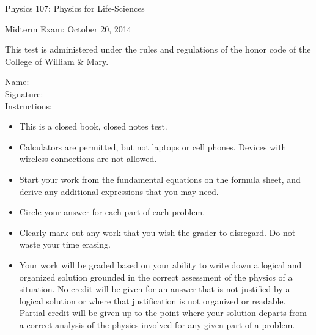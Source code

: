 \documentclass[letterpaper,addpoints,answers]{exam}
\begin{document}
\begin{coverpages}
 \large\bfseries
 
 \noindent 
 Physics 107: Physics for Life-Sciences

 \vspace{2ex}
 \noindent
 Midterm Exam: October 20, 2014

 \vspace{3ex}
 \noindent 
 This test is administered under the rules and regulations of the honor code of the College of William \& Mary.

 \vspace{2ex}
 \noindent 
 Name:\enspace\makebox[2.3in]{\hrulefill} \\

 \noindent 
 Signature:\enspace\makebox[2in]{\hrulefill} \\

 \vspace{5ex}
 \noindent 
 Instructions:
 \begin{itemize}
  \item This is a closed book, closed notes test.
  \item Calculators are permitted, but not laptops or cell phones. Devices with wireless connections are not allowed.
  \item Start your work from the fundamental equations on the formula sheet, and derive any additional expressions that you may need.
  \item Circle your answer for each part of each problem. 
  \item Clearly mark out any work that you wish the grader to disregard.  Do not waste your time erasing.
  \item Your work will be graded based on your ability to write down a logical and organized solution grounded in the correct assessment of the physics of a situation. No credit will be given for an answer that is not justified by a logical solution or where that justification is not organized or readable. Partial credit will be given up to the point where your solution departs from a correct analysis of the physics involved for any given part of a problem.
 \end{itemize}

 \pagebreak

 \begin{center}
  \gradetable[v][questions]
 \end{center}
 
\end{coverpages}
 
\end{document}
